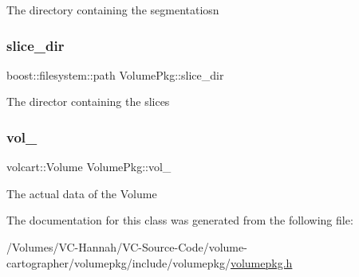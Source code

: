 The directory containing the segmentatiosn \hypertarget{classVolumePkg_a277efff0ba8ce1043c83d15eaf5c5427}{}\label{classVolumePkg_a277efff0ba8ce1043c83d15eaf5c5427} 
\subsubsection{\texorpdfstring{slice\+\_\+dir}{slice\_dir}}
{\footnotesize\ttfamily boost\+::filesystem\+::path Volume\+Pkg\+::slice\+\_\+dir\hspace{0.3cm}{\ttfamily [private]}}

The director containing the slices \hypertarget{classVolumePkg_a0df52f6f476a106802da0bfc1b2d5b23}{}\label{classVolumePkg_a0df52f6f476a106802da0bfc1b2d5b23} 
\subsubsection{\texorpdfstring{vol\+\_\+}{vol\_}}
{\footnotesize\ttfamily volcart\+::\+Volume Volume\+Pkg\+::vol\+\_\+\hspace{0.3cm}{\ttfamily [private]}}

The actual data of the Volume 

The documentation for this class was generated from the following file\+:\begin{DoxyCompactItemize}
\item 
/\+Volumes/\+V\+C-\/\+Hannah/\+V\+C-\/\+Source-\/\+Code/volume-\/cartographer/volumepkg/include/volumepkg/\hyperlink{volumepkg_8h}{volumepkg.\+h}\end{DoxyCompactItemize}
